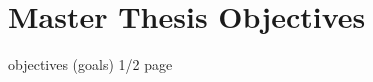 \chapter{Master Thesis Objectives}
\label{chapter:02:master_thesis_objectives}

objectives (goals) 
1/2 page

